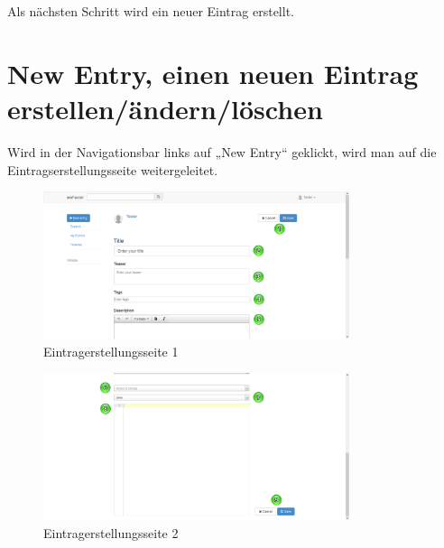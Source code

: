 Als nächsten Schritt wird ein neuer Eintrag erstellt.


\chapter{New Entry, einen neuen Eintrag erstellen/ändern/löschen}

Wird in der Navigationsbar links auf „New Entry“ geklickt, wird man auf die Eintragserstellungsseite weitergeleitet.

\begin{figure}[H]
    \centering
    \includegraphics[width=0.8\textwidth]{Bilder/11.png}
    \caption{Eintragerstellungsseite 1 }
    \label{fig:eintragerstellungsseite1}
\end{figure}
\begin{figure}[H]
    \centering
    \includegraphics[width=0.8\textwidth]{Bilder/12.png}
    \caption{Eintragerstellungsseite 2 }
    \label{fig:eintragerstellungsseite2}
\end{figure}


